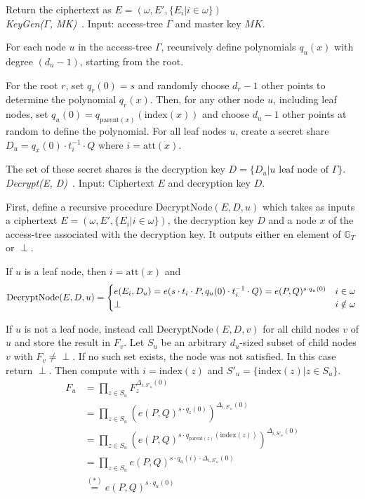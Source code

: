 Return the ciphertext as $E = (\omega, E', \{E_i | i \in \omega\})$
\\

\emph{KeyGen($\Gamma$, MK)}~\cite{goyal_attribute-based_2006}.
Input: \gls{access-tree} $\Gamma$ and master key $MK$.

For each node $u$ in the \gls{access-tree} $\Gamma$, recursively define polynomials $q_u(x)$ with degree $(d_u - 1)$, starting from the root.

For the root $r$, set $q_r(0) = s$ and randomly choose $d_r -1$ other points to determine the polynomial $q_r(x)$.
Then, for any other node $u$, including leaf nodes, set $q_u(0) = q_{\text{parent}(x)}(\text{index}(x))$ and choose $d_u -1$ other points at random to define the polynomial. 
For all leaf nodes $u$, create a secret share $D_u = q_x(0) \cdot t_i^{-1} \cdot Q$ where $i = \text{att}(x)$.

The set of these secret shares is the decryption key $D = \{D_u | u \text{ leaf node of } \Gamma\}$.
\\

\emph{Decrypt(E, D)}~\cite{goyal_attribute-based_2006}.
Input: Ciphertext $E$ and decryption key $D$.

First, define a recursive procedure $\text{DecryptNode}(E, D, u)$ which takes as inputs a ciphertext $E = (\omega, E', \{E_i | i \in \omega\})$, the decryption key $D$ and a node $x$ of the \gls{access-tree} associated with the decryption key.
It outputs either en element of $\mathbb{G}_T$ or $\perp$.

If $u$ is a leaf node, then $i = \text{att}(x)$ and 
\begin{equation}
    \text{DecryptNode}(E, D, u) = \begin{cases}
        e(E_i, D_u) = e(s \cdot t_i \cdot P, q_u(0) \cdot t_i^{-1} \cdot Q) = e(P, Q)^{s\cdot q_u(0)} & i \in \omega\\
        \perp & i \notin \omega
    \end{cases}\\
\end{equation}

If $u$ is not a leaf node, instead call $\text{DecryptNode}(E, D, v)$ for all child nodes $v$ of $u$ and store the result in $F_v$.
Let $S_u$ be an arbitrary $d_u$-sized subset of child nodes $v$ with $F_v \neq \perp$. If no such set exists, the node was not satisfied. In this case return $\perp$.
Then compute with $i = \text{index}(z)$ and $S'_u = \{\text{index}(z) | z \in S_u\}$.
\begin{equation}
    \begin{split}
        F_u &= \prod_{z \in S_u} F_z^{\Delta_{i,S'_u}(0)}\\
        &= \prod_{z \in S_u} (e(P,Q)^{s\cdot q_z(0)})^{\Delta_{i,S'_u}(0)}\\
        &= \prod_{z \in S_u} (e(P,Q)^{s\cdot q_{\text{parent}(z)}(\text{index}(z))})^{\Delta_{i,S'_u}(0)}\\
        &= \prod_{z \in S_u} e(P,Q)^{s\cdot q_u(i) \cdot \Delta_{i,S'_u}(0)}\\
        &\stackrel{(*)}{=} e(P,Q)^{s \cdot q_u(0)}
    \end{split}
\end{equation}

